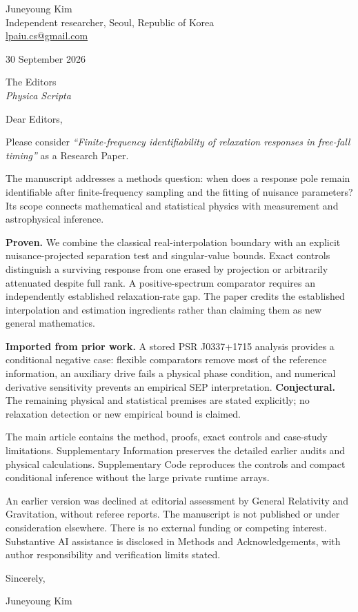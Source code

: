 \documentclass[12pt]{article}
\begin{document}
Juneyoung Kim\\
Independent researcher, Seoul, Republic of Korea\\
\href{mailto:lpaiu.cs@gmail.com}{lpaiu.cs@gmail.com}

30 September 2026

The Editors\\
\emph{Physica Scripta}

Dear Editors,

Please consider \emph{``Finite-frequency identifiability of relaxation responses in free-fall timing''} as a Research Paper.

The manuscript addresses a methods question: when does a response pole remain identifiable after finite-frequency sampling and the fitting of nuisance parameters? Its scope connects mathematical and statistical physics with measurement and astrophysical inference.

\textbf{Proven.} We combine the classical real-interpolation boundary with an explicit nuisance-projected separation test and singular-value bounds. Exact controls distinguish a surviving response from one erased by projection or arbitrarily attenuated despite full rank. A positive-spectrum comparator requires an independently established relaxation-rate gap. The paper credits the established interpolation and estimation ingredients rather than claiming them as new general mathematics.

\textbf{Imported from prior work.} A stored PSR J0337+1715 analysis provides a conditional negative case: flexible comparators remove most of the reference information, an auxiliary drive fails a physical phase condition, and numerical derivative sensitivity prevents an empirical SEP interpretation. \textbf{Conjectural.} The remaining physical and statistical premises are stated explicitly; no relaxation detection or new empirical bound is claimed.

The main article contains the method, proofs, exact controls and case-study limitations. Supplementary Information preserves the detailed earlier audits and physical calculations. Supplementary Code reproduces the controls and compact conditional inference without the large private runtime arrays.

An earlier version was declined at editorial assessment by General Relativity and Gravitation, without referee reports. The manuscript is not published or under consideration elsewhere. There is no external funding or competing interest. Substantive AI assistance is disclosed in Methods and Acknowledgements, with author responsibility and verification limits stated.

Sincerely,

Juneyoung Kim
\end{document}

